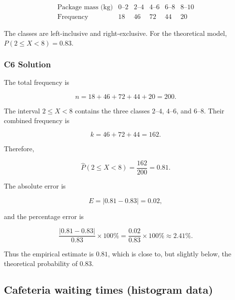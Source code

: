 \[
\begin{array}{c|ccccc}
	\text{Package mass (kg)}
	& 0\text{--}2 & 2\text{--}4 & 4\text{--}6 & 6\text{--}8 & 8\text{--}10 \\ \hline
	\text{Frequency} & 18 & 46 & 72 & 44 & 20
\end{array}
\]

The classes are left-inclusive and right-exclusive. For the theoretical
model, $P(2\leq X<8)=0.83$.


\subsubsection*{C6 Solution}
\label{subsec:c6-only-grouped-solution}

The total frequency is

\[
n=18+46+72+44+20=200.
\]

The interval $2\leq X<8$ contains the three classes $2$--$4$, $4$--$6$,
and $6$--$8$. Their combined frequency is

\[
k=46+72+44=162.
\]

Therefore,

\[
\widehat P(2\leq X<8)=\frac{162}{200}=0.81.
\]

The absolute error is

\[
E=|0.81-0.83|=0.02,
\]

and the percentage error is

\[
\frac{|0.81-0.83|}{0.83}\times100\%
=\frac{0.02}{0.83}\times100\%
\approx2.41\%.
\]

Thus the empirical estimate is $0.81$, which is close to, but slightly
below, the theoretical probability of $0.83$.



\subsection{Cafeteria waiting times (histogram data)}
\label{sec:c6-only-histogram}


